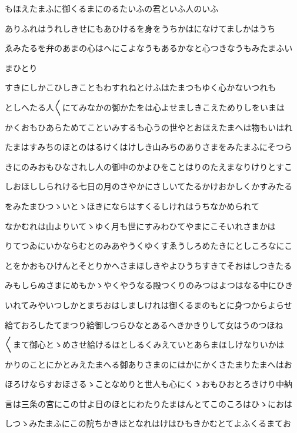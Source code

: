 \documentclass[a4paper,11pt,landscape]{ltjtarticle}
\begin{document}
\par\medskip
もほえたまふに御くるまにのるたいふの君といふ人のいふ
\par\medskip
ありふれはうれしきせにもあひけるを身をうちかはになけてましかはうち
\par\medskip
ゑみたるを弁のあまの心はへにこよなうもあるかなと心つきなうもみたまふい
\par\medskip
まひとり
\par\medskip
すきにしかこひしきこともわすれねとけふはたまつもゆく心かないつれも
\par\medskip
としへたる人〱にてみなかの御かたをは心よせましきこえためりしをいまは
\par\medskip
かくおもひあらためてこといみするも心うの世やとおほえたまへは物もいはれ
\par\medskip
たまはすみちのほとのはるけくはけしき山みちのありさまをみたまふにそつら
\par\medskip
きにのみおもひなされし人の御中のかよひをことはりのたえまなりけりとすこ
\par\medskip
しおほししられける七日の月のさやかにさしいてたるかけおかしくかすみたる
\par\medskip
をみたまひつゝいとゝほきにならはすくるしけれはうちなかめられて
\par\medskip
なかむれは山よりいてゝゆく月も世にすみわひてやまにこそいれさまかは
\par\medskip
りてつゐにいかならむとのみあやうくゆくすゑうしろめたきにとしころなにこ
\par\medskip
とをかおもひけんとそとりかへさまほしきやよひうちすきてそおはしつきたる
\par\medskip
みもしらぬさまにめもかゝやくやうなる殿つくりのみつはよつはなる中にひき
\par\medskip
いれてみやいつしかとまちおはしましけれは御くるまのもとに身つからよらせ
\par\medskip
給ておろしたてまつり給御しつらひなとあるへきかきりして女はうのつほね
\par\medskip
〱まて御心とゝめさせ給けるほとしるくみえていとあらまほしけなりいかは
\par\medskip
かりのことにかとみえたまへる御ありさまのにはかにかくさたまりたまへはお
\par\medskip
ほろけならすおほさるゝことなめりと世人も心にくゝおもひおとろきけり中納
\par\medskip
言は三条の宮にこの廿よ日のほとにわたりたまはんとてこのころはひゝにおは
\par\medskip
しつゝみたまふにこの院ちかきほとなれはけはひもきかむとてよふくるまてお
\end{document}
